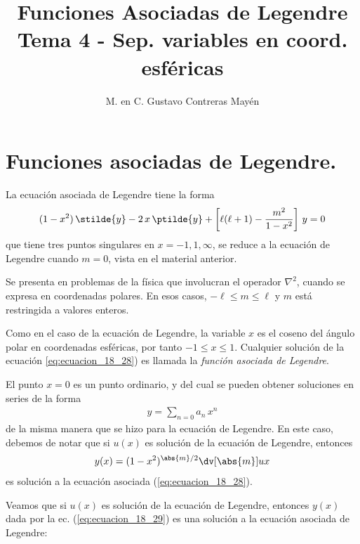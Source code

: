 
\usepackage{apacite}
\title{Funciones Asociadas de Legendre \\ \large {Tema 4 - Sep. variables en coord. esféricas} \vspace{-3ex}}
\author{M. en C. Gustavo Contreras Mayén}
\date{ }

\vspace{-4cm}
\maketitle
\fontsize{14}{14}\selectfont
\tableofcontents
\newpage
\section{Funciones asociadas de Legendre.}
La ecuación asociada de Legendre tiene la forma
\begin{align}
(1 - x^{2}) \, \stilde{y} - 2 \, x \, \ptilde{y} + \left[ \ell (\ell + 1) - \dfrac{m^{2}}{1 - x^{2}} \right] \, y = 0
\label{eq:ecuacion_18_28}
\end{align}
que tiene tres puntos singulares en $x = -1, 1, \infty$, se reduce a la ecuación de Legendre cuando $m=0$, vista en el material anterior.
\par
Se presenta en problemas de la física que involucran el operador $\nabla^{2}$, cuando se expresa en coordenadas polares. En esos casos, $- \ell \leq m \leq \ell$ y $m$ está restringida a valores enteros.
\par
Como en el caso de la ecuación de Legendre, la variable $x$ es el coseno del ángulo polar en coordenadas esféricas, por tanto $-1 \leq x \leq 1$. Cualquier solución de la ecuación \ref{eq:ecuacion_18_28}) es llamada la \emph{función asociada de Legendre}.
\par
El punto $x = 0$ es un punto ordinario, y del cual se pueden obtener soluciones en series de la forma
\begin{align*}
y = \sum_{n=0} a_{n} \, x^{n}
\end{align*}
de la misma manera que se hizo para la ecuación de Legendre. En este caso, debemos de notar que si $u(x)$ es solución de la ecuación de Legendre, entonces
\begin{align}
y(x) = (1 -x^{2})^{\abs{m}/2} \dv[\abs{m}]{u}{x}
\label{eq:ecuacion_18_29}
\end{align}
es solución a la ecuación asociada (\ref{eq:ecuacion_18_28}).
\par
Veamos que si $u(x)$ es solución de la ecuación de Legendre, entonces $y(x)$ dada por la ec. (\ref{eq:ecuacion_18_29}) es una solución a la ecuación asociada de Legendre:
